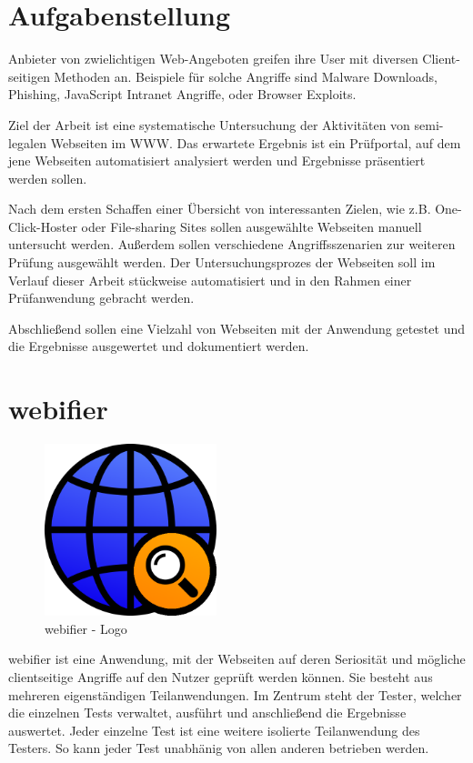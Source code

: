 \section{Aufgabenstellung}
Anbieter von zwielichtigen Web-Angeboten greifen ihre User mit diversen Client-seitigen Methoden an. Beispiele für solche Angriffe sind Malware Downloads, Phishing, JavaScript Intranet Angriffe, oder Browser Exploits.

Ziel der Arbeit ist eine systematische Untersuchung der Aktivitäten von semi-legalen Webseiten im \ac{WWW}. Das erwartete Ergebnis ist ein Prüfportal, auf dem jene Webseiten automatisiert analysiert werden und Ergebnisse präsentiert werden sollen.

Nach dem ersten Schaffen einer Übersicht von interessanten Zielen, wie z.B. One-Click-Hoster oder File-sharing Sites sollen ausgewählte Webseiten manuell untersucht werden. Außerdem sollen verschiedene Angriffsszenarien zur weiteren Prüfung ausgewählt werden. Der Untersuchungsprozes der Webseiten soll im Verlauf dieser Arbeit stückweise automatisiert und in den Rahmen einer Prüfanwendung gebracht werden.

Abschließend sollen eine Vielzahl von Webseiten mit der Anwendung getestet und die Ergebnisse ausgewertet und dokumentiert werden.

\section{webifier}

\begin{figure}[H]
  \centering
  \includegraphics[width=5cm]{images/webifier}
  \caption{webifier - Logo}
  \label{fig:webifier-logo}
\end{figure}

webifier ist eine Anwendung, mit der Webseiten auf deren Seriosität und mögliche clientseitige Angriffe auf den Nutzer geprüft werden können. Sie besteht aus mehreren eigenständigen Teilanwendungen. Im Zentrum steht der Tester, welcher die einzelnen Tests verwaltet, ausführt und anschließend die Ergebnisse auswertet. Jeder einzelne Test ist eine weitere isolierte Teilanwendung des Testers. So kann jeder Test unabhänig von allen anderen betrieben werden.

